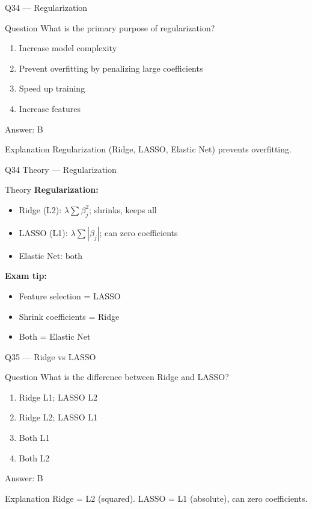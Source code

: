 \documentclass[aspectratio=169,8pt]{beamer}
\begin{document}
	\begin{frame}{Q34 --- Regularization}
		\begin{block}{Question}
			What is the primary purpose of regularization?
		\end{block}
		\begin{enumerate}[label=\Alph*.]
			\item Increase model complexity
			\item Prevent overfitting by penalizing large coefficients
			\item Speed up training
			\item Increase features
		\end{enumerate}
		\begin{exampleblock}{Answer: B}
		\end{exampleblock}
		\begin{block}{Explanation}
			Regularization (Ridge, LASSO, Elastic Net) prevents overfitting.
		\end{block}
	\end{frame}
	
	\begin{frame}{Q34 Theory --- Regularization}
		\begin{block}{Theory}
			\textbf{Regularization:}
			\begin{itemize}
				\item Ridge (L2): $\lambda \sum \beta_j^2$; shrinks, keeps all
				\item LASSO (L1): $\lambda \sum |\beta_j|$; can zero coefficients
				\item Elastic Net: both
			\end{itemize}
			\textbf{Exam tip:}
			\begin{itemize}
				\item Feature selection = LASSO
				\item Shrink coefficients = Ridge
				\item Both = Elastic Net
			\end{itemize}
		\end{block}
	\end{frame}
	
	\begin{frame}{Q35 --- Ridge vs LASSO}
		\begin{block}{Question}
			What is the difference between Ridge and LASSO?
		\end{block}
		\begin{enumerate}[label=\Alph*.]
			\item Ridge L1; LASSO L2
			\item Ridge L2; LASSO L1
			\item Both L1
			\item Both L2
		\end{enumerate}
		\begin{exampleblock}{Answer: B}
		\end{exampleblock}
		\begin{block}{Explanation}
			Ridge = L2 (squared). LASSO = L1 (absolute), can zero coefficients.
		\end{block}
	\end{frame}
	
\end{document}
